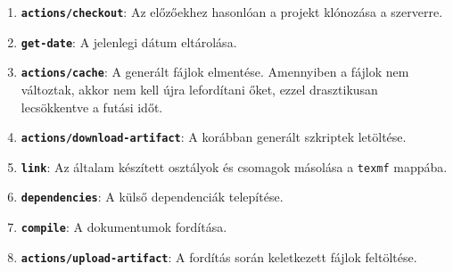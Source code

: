\begin{enumerate}
	\item \texttt{\textbf{actions/checkout}}:
	      Az előzőekhez hasonlóan a projekt klónozása a szerverre.

	\item \texttt{\textbf{get-date}}:
	      A jelenlegi dátum eltárolása.

	\item \texttt{\textbf{actions/cache}}:
	      A generált fájlok elmentése. Amennyiben a fájlok nem változtak, akkor
	      nem kell újra lefordítani őket, ezzel drasztikusan lecsökkentve a
	      futási időt.

	\item \texttt{\textbf{actions/download-artifact}}:
	      A korábban generált szkriptek letöltése.

	\item \texttt{\textbf{link}}:
	      Az általam készített osztályok és csomagok másolása a \texttt{texmf}
	      mappába.

	\item \texttt{\textbf{dependencies}}:
	      A külső dependenciák telepítése.

	\item \texttt{\textbf{compile}}:
	      A dokumentumok fordítása.

	\item \texttt{\textbf{actions/upload-artifact}}:
	      A fordítás során keletkezett fájlok feltöltése.
\end{enumerate}
